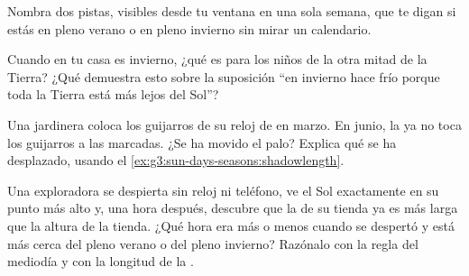 \begin{exercise}[$\star$]\label{exo:g3:sun-days-seasons:8}
Nombra dos pistas, visibles desde tu ventana en una sola semana, que
te digan si estás en pleno verano o en pleno invierno sin mirar un
calendario.
\end{exercise}

\begin{exercise}[$\star$]\label{exo:g3:sun-days-seasons:9}
Cuando en tu casa es invierno, ¿qué  es para los niños de la
otra mitad de la Tierra? ¿Qué demuestra esto sobre la suposición ``en
invierno hace frío porque toda la Tierra está más lejos del Sol''?
\end{exercise}

\begin{exercise}[$\star\star$]\label{exo:g3:sun-days-seasons:10}
Una jardinera coloca los guijarros de su reloj de  en marzo. En
junio, la  ya no toca los guijarros a las  marcadas.
¿Se ha movido el palo? Explica qué se ha desplazado, usando el
\cref{ex:g3:sun-days-seasons:shadowlength}.
\end{exercise}

\begin{exercise}[$\star\star$]\label{exo:g3:sun-days-seasons:11}
Una exploradora se despierta sin reloj ni teléfono, ve el Sol
exactamente en su punto más alto y, una hora después, descubre que la
 de su tienda ya es más larga que la altura de la tienda.
¿Qué hora era más o menos cuando se despertó y está más cerca del
pleno verano o del pleno invierno? Razónalo con la regla del mediodía
y con la longitud de la .
\end{exercise}
